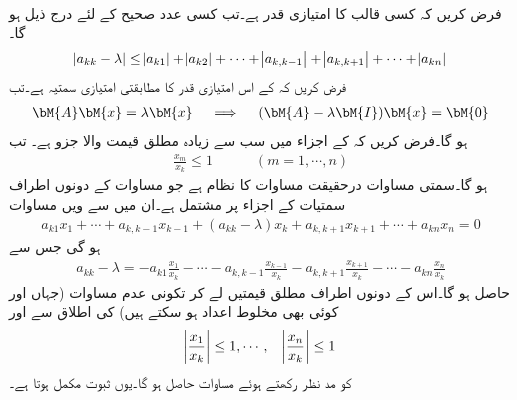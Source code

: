\quad {}\\
فرض کریں کہ کسی  قالب  کا امتیازی قدر  ہے۔تب کسی عدد صحیح  کے لئے درج ذیل ہو گا۔
\begin{align}\label{مساوات_خطی_اعدادی_گرشگرین_پ}
\abs{a_{kk}-\lambda}\le \abs{a_{k1}}+\abs{a_{k2}}+\cdots+\abs{a_{k,k-1}}+\abs{a_{k,k+1}}+\cdots+\abs{a_{kn}}
\end{align}
\quad
فرض کریں کہ  کے اس امتیازی قدر  کا مطابقتی امتیازی سمتیہ  ہے۔تب
\begin{align}\label{مساوات_خطی_اعدادی_گرشگرین_ٹ}
\bM{A}\bM{x}=\lambda\bM{x}\quad \implies \quad (\bM{A}-\lambda \bM{I})\bM{x}=\bM{0}
\end{align}
ہو گا۔فرض کریں کہ  کے اجزاء میں سب سے زیادہ مطلق قیمت والا جزو  ہے۔ تب
\begin{align*}
\tfrac{x_m}{x_k}\le 1\quad \quad \quad  (m=1,\cdots, n)
\end{align*}
ہو گا۔سمتی مساوات  درحقیقت  مساوات کا نظام ہے جو مساوات کے دونوں اطراف سمتیات کے  اجزاء پر مشتمل ہے۔ان میں سے  ویں مساوات
\begin{align*}
a_{k1}x_1+\cdots+a_{k,k-1}x_{k-1}+(a_{kk}-\lambda)x_k+a_{k,k+1}x_{k+1}+\cdots+a_{kn}x_n=0
\end{align*}
ہو گی جس سے 
\begin{align*}
a_{kk}-\lambda=-a_{k1}\frac{x_1}{x_k}-\cdots-a_{k,k-1}\frac{x_{k-1}}{x_k}-a_{k,k+1}\frac{x_{k+1}}{x_k}-\cdots-a_{kn}\frac{x_{n}}{x_k}
\end{align*}
حاصل ہو گا۔اس کے دونوں اطراف مطلق قیمتیں لے کر تکونی عدم مساوات  (جہاں  اور  کوئی بھی مخلوط اعداد ہو سکتے ہیں) کی اطلاق سے اور
\begin{align*}
\abs{\frac{x_1}{x_k}}\le 1,\cdots, \quad \abs{\frac{x_n}{x_k}}\le 1
\end{align*}
 کو مد نظر رکھتے ہوئے  مساوات  حاصل ہو گا۔یوں ثبوت مکمل ہوتا ہے۔

